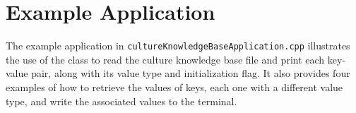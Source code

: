 \documentclass{CSSRforAfrica}
\begin{document}
\section{Example Application}
\label{section:application}
\vspace{-2mm}
The example application in {\small \tt cultureKnowledgeBaseApplication.cpp} illustrates the use of the class to read the culture knowledge base file and print each key-value pair, along with its value type and initialization flag.  It also provides four examples of how to retrieve the values of keys, each one with a different value type, and write the associated values to the terminal.  \\
\vspace{-5mm}
\end{document}
